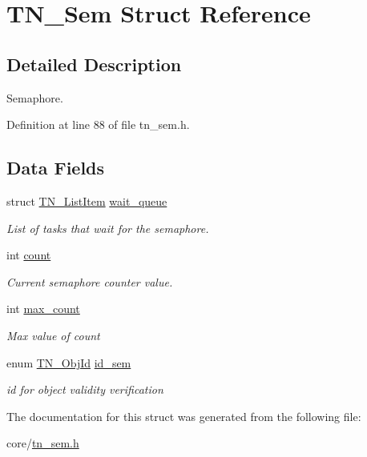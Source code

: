\hypertarget{structTN__Sem}{\section{T\+N\+\_\+\+Sem Struct Reference}
\label{structTN__Sem}
}


\subsection{Detailed Description}
Semaphore. 

Definition at line 88 of file tn\+\_\+sem.\+h.

\subsection*{Data Fields}
\begin{DoxyCompactItemize}
\item 
\hypertarget{structTN__Sem_ac6cf5b47221528a5ce024c60b92be280}{struct \hyperlink{structTN__ListItem}{T\+N\+\_\+\+List\+Item} \hyperlink{structTN__Sem_ac6cf5b47221528a5ce024c60b92be280}{wait\+\_\+queue}}\label{structTN__Sem_ac6cf5b47221528a5ce024c60b92be280}

\begin{DoxyCompactList}\small\item\em List of tasks that wait for the semaphore. \end{DoxyCompactList}\item 
\hypertarget{structTN__Sem_a5a2358e2425da2930ef8e105a642822b}{int \hyperlink{structTN__Sem_a5a2358e2425da2930ef8e105a642822b}{count}}\label{structTN__Sem_a5a2358e2425da2930ef8e105a642822b}

\begin{DoxyCompactList}\small\item\em Current semaphore counter value. \end{DoxyCompactList}\item 
\hypertarget{structTN__Sem_abd62d79c3aace05abd7252f2058b1e5b}{int \hyperlink{structTN__Sem_abd62d79c3aace05abd7252f2058b1e5b}{max\+\_\+count}}\label{structTN__Sem_abd62d79c3aace05abd7252f2058b1e5b}

\begin{DoxyCompactList}\small\item\em Max value of {\ttfamily count} \end{DoxyCompactList}\item 
\hypertarget{structTN__Sem_a810526e9b3d5595278ebb70e59a128e1}{enum \hyperlink{tn__common_8h_ae779dd1f6735f6e139fb70acd004d976}{T\+N\+\_\+\+Obj\+Id} \hyperlink{structTN__Sem_a810526e9b3d5595278ebb70e59a128e1}{id\+\_\+sem}}\label{structTN__Sem_a810526e9b3d5595278ebb70e59a128e1}

\begin{DoxyCompactList}\small\item\em id for object validity verification \end{DoxyCompactList}\end{DoxyCompactItemize}


The documentation for this struct was generated from the following file\+:\begin{DoxyCompactItemize}
\item 
core/\hyperlink{tn__sem_8h}{tn\+\_\+sem.\+h}\end{DoxyCompactItemize}
